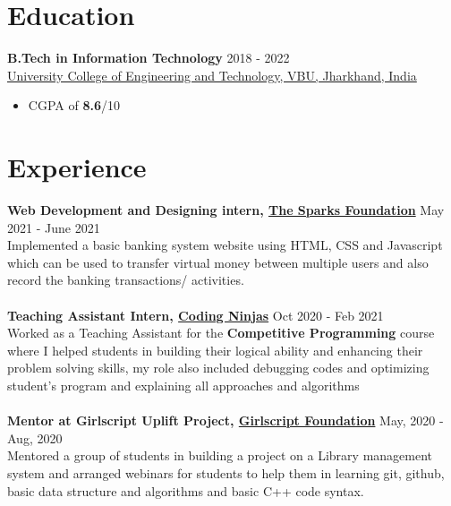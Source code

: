 \documentclass[margin, centered]{res}
\begin{document}
\begin{resume}

\section{Education}
\textbf{B.Tech in Information Technology} \hfill 2018 - 2022 \\
\href{http://ucetvbu.ac.in/}{University College of Engineering and Technology, VBU, Jharkhand, India}
\begin{itemize}
 \item CGPA of \textbf{8.6}/10
\end{itemize}

\section{Experience}
\textbf{Web Development and Designing intern, \href{https://drive.google.com/file/d/1bM6sxmO3PgQXI3Vx1u0qqo9hIgjefS3i/view?usp=sharing}{The Sparks Foundation}} \hfill May 2021 - June 2021\\
Implemented a basic banking system website using HTML, CSS and Javascript which can be used to transfer virtual money between multiple users and also record the banking transactions/ activities.\\
\\
\textbf{Teaching Assistant Intern, \href{https://drive.google.com/file/d/1tggg7RXVF4dtAdR-jFnV6tpvBVyKcyTD/view?usp=sharing}{Coding Ninjas}} \hfill Oct 2020 - Feb 2021 \\
Worked as a Teaching Assistant for the \textbf{Competitive Programming} course where I helped students in building their logical ability and enhancing their problem solving skills, my role also included debugging codes and optimizing student's program and explaining all approaches and algorithms\\
\\
\textbf{Mentor at Girlscript Uplift Project, \href{https://drive.google.com/file/d/1-HEx-n0SeThN8SUmXoDLzdNj-KmQgGuv/view?usp=sharing}{Girlscript Foundation}} \hfill May, 2020 - Aug, 2020 \\
Mentored a group of students in building a project on a Library management system and arranged webinars for students to help them in learning git, github, basic data structure and algorithms and basic C++ code syntax.

\end{resume}
\end{document}
